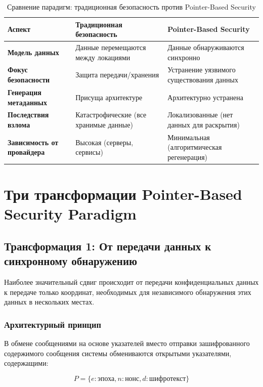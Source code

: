\documentclass[11pt,a4paper]{article}
\begin{document}
\begin{table}[h]
\centering
\caption{Сравнение парадигм: традиционная безопасность против Pointer-Based Security}
\begin{tabularx}{\textwidth}{|l|X|X|}
\hline
\textbf{Аспект} & \textbf{Традиционная безопасность} & \textbf{Pointer-Based Security} \\
\hline
\textbf{Модель данных} & Данные перемещаются между локациями & Данные обнаруживаются синхронно \\
\hline
\textbf{Фокус безопасности} & Защита передачи/хранения & Устранение уязвимого существования данных \\
\hline
\textbf{Генерация метаданных} & Присуща архитектуре & Архитектурно устранена \\
\hline
\textbf{Последствия взлома} & Катастрофические (все хранимые данные) & Локализованные (нет данных для раскрытия) \\
\hline
\textbf{Зависимость от провайдера} & Высокая (серверы, сервисы) & Минимальная (алгоритмическая регенерация) \\
\hline
\end{tabularx}
\end{table}

\section{Три трансформации Pointer-Based Security Paradigm}

\subsection{Трансформация 1: От передачи данных к синхронному обнаружению}

Наиболее значительный сдвиг происходит от передачи конфиденциальных данных к передаче только координат, необходимых для независимого обнаружения этих данных в нескольких местах.

\subsubsection{Архитектурный принцип}

В обмене сообщениями на основе указателей вместо отправки зашифрованного содержимого сообщения системы обмениваются открытыми указателями, содержащими:

\begin{equation}
P = \{e: \text{эпоха}, n: \text{нонс}, d: \text{шифротекст}\}
\end{equation}
\end{document}
